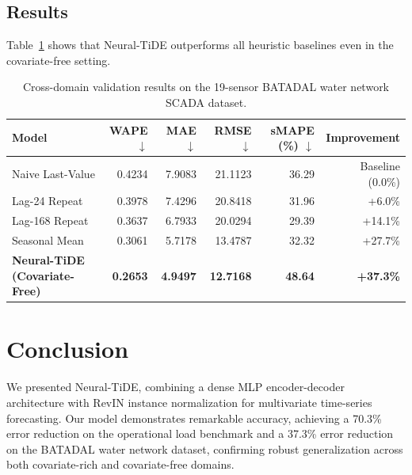 \documentclass[11pt,a4paper]{article}
\begin{document}
\subsection{Results}
Table~\ref{tab:batadal_results} shows that Neural-TiDE outperforms all heuristic baselines even in the covariate-free setting.

\begin{table}[h]
\centering
\small
\begin{tabular}{lrrrrr}
\toprule
\textbf{Model} & \textbf{WAPE} $\downarrow$ & \textbf{MAE} $\downarrow$ & \textbf{RMSE} $\downarrow$ & \textbf{sMAPE (\%)} $\downarrow$ & \textbf{Improvement} \\
\midrule
Naive Last-Value & 0.4234 & 7.9083 & 21.1123 & 36.29 & Baseline (0.0\%) \\
Lag-24 Repeat & 0.3978 & 7.4296 & 20.8418 & 31.96 & +6.0\% \\
Lag-168 Repeat & 0.3637 & 6.7933 & 20.0294 & 29.39 & +14.1\% \\
Seasonal Mean & 0.3061 & 5.7178 & 13.4787 & 32.32 & +27.7\% \\
\midrule
\textbf{Neural-TiDE (Covariate-Free)} & \textbf{0.2653} & \textbf{4.9497} & \textbf{12.7168} & \textbf{48.64} & \textbf{+37.3\%} \\
\bottomrule
\end{tabular}
\caption{Cross-domain validation results on the 19-sensor BATADAL water network SCADA dataset.}
\label{tab:batadal_results}
\end{table}

\section{Conclusion}
We presented Neural-TiDE, combining a dense MLP encoder-decoder architecture with RevIN instance normalization for multivariate time-series forecasting. Our model demonstrates remarkable accuracy, achieving a 70.3\% error reduction on the operational load benchmark and a 37.3\% error reduction on the BATADAL water network dataset, confirming robust generalization across both covariate-rich and covariate-free domains.



\end{document}
